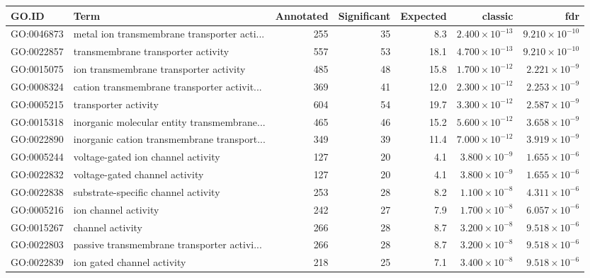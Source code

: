 \begin{table}[ht]
\centering
\begin{adjustbox}{max width=\textwidth}
\begin{tabular}{llrrrrr}
  \hline
GO.ID & Term & Annotated & Significant & Expected & classic & fdr \\ 
  \hline
GO:0046873 & metal ion transmembrane transporter acti... & 255 & 35 & 8.3 & $2.400 \times 10^{-13}$ & $9.210 \times 10^{-10}$ \\ 
  GO:0022857 & transmembrane transporter activity & 557 & 53 & 18.1 & $4.700 \times 10^{-13}$ & $9.210 \times 10^{-10}$ \\ 
  GO:0015075 & ion transmembrane transporter activity & 485 & 48 & 15.8 & $1.700 \times 10^{-12}$ & $2.221 \times 10^{-9}$ \\ 
  GO:0008324 & cation transmembrane transporter activit... & 369 & 41 & 12.0 & $2.300 \times 10^{-12}$ & $2.253 \times 10^{-9}$ \\ 
  GO:0005215 & transporter activity & 604 & 54 & 19.7 & $3.300 \times 10^{-12}$ & $2.587 \times 10^{-9}$ \\ 
  GO:0015318 & inorganic molecular entity transmembrane... & 465 & 46 & 15.2 & $5.600 \times 10^{-12}$ & $3.658 \times 10^{-9}$ \\ 
  GO:0022890 & inorganic cation transmembrane transport... & 349 & 39 & 11.4 & $7.000 \times 10^{-12}$ & $3.919 \times 10^{-9}$ \\ 
  GO:0005244 & voltage-gated ion channel activity & 127 & 20 & 4.1 & $3.800 \times 10^{-9}$ & $1.655 \times 10^{-6}$ \\ 
  GO:0022832 & voltage-gated channel activity & 127 & 20 & 4.1 & $3.800 \times 10^{-9}$ & $1.655 \times 10^{-6}$ \\ 
  GO:0022838 & substrate-specific channel activity & 253 & 28 & 8.2 & $1.100 \times 10^{-8}$ & $4.311 \times 10^{-6}$ \\ 
  GO:0005216 & ion channel activity & 242 & 27 & 7.9 & $1.700 \times 10^{-8}$ & $6.057 \times 10^{-6}$ \\ 
  GO:0015267 & channel activity & 266 & 28 & 8.7 & $3.200 \times 10^{-8}$ & $9.518 \times 10^{-6}$ \\ 
  GO:0022803 & passive transmembrane transporter activi... & 266 & 28 & 8.7 & $3.200 \times 10^{-8}$ & $9.518 \times 10^{-6}$ \\ 
  GO:0022839 & ion gated channel activity & 218 & 25 & 7.1 & $3.400 \times 10^{-8}$ & $9.518 \times 10^{-6}$ \\ 

\end{tabular}
\end{adjustbox}
\end{table}
